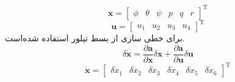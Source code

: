 \begin{equation}
	\boldsymbol{x} = \begin{bmatrix}
		\phi& \theta & \psi & p& q& r
	\end{bmatrix}^\mathrm{T}
\end{equation}
\begin{equation}
	\boldsymbol{u} = \begin{bmatrix}
		u_1&u_2&u_3&u_4
	\end{bmatrix}^\mathrm{T}
\end{equation}
برای خطی سازی از بسط تیلور استفاده شده‌است.
\begin{equation}
	\delta \dot{\boldsymbol{x}} = \dfrac{\partial \boldsymbol a}{\partial \boldsymbol x}\delta \boldsymbol x + \dfrac{\partial \boldsymbol a}{\partial \boldsymbol u}\delta \boldsymbol u 
\end{equation}
\begin{equation}
	\dot{\boldsymbol{x}} =
	\begin{bmatrix}
		\delta \dot x_1&
		\delta \dot x_2&
		\delta \dot x_3&
		\delta \dot x_4&
		\delta \dot x_5&
		\delta \dot x_6
	\end{bmatrix}^\mathrm{T}
\end{equation}


